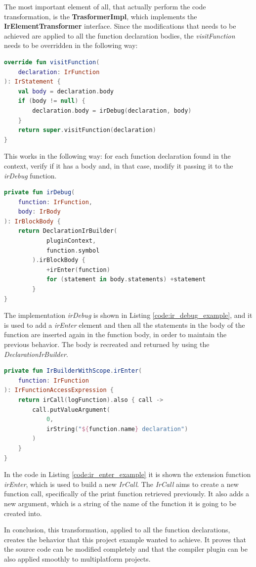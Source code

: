 The most important element of all, that actually perform the code transformation, is the \textbf{TrasformerImpl}, which implements the \textbf{IrElementTransformer} interface.\newline
Since the modifications that needs to be achieved are applied to all the function declaration bodies, the \textit{visitFunction}  needs to be overridden in the following way:
\begin{lstlisting}[caption={Example of \textit{visitFunction} implementation of the transformer, used to visit all the function declarations}, captionpos=b, language=Kotlin, label={code:visit_function_declaration_example}]
override fun visitFunction(
    declaration: IrFunction
): IrStatement {
    val body = declaration.body
    if (body != null) {
        declaration.body = irDebug(declaration, body)
    }
    return super.visitFunction(declaration)
}
\end{lstlisting}
This works in the following way: for each function declaration found in the context, verify if it has a body and, in that case, modify it passing it to the \textit{irDebug} function.
\begin{lstlisting}[caption={Example of implementation of a function that adds a new element into the function body}, captionpos=b, language=Kotlin, label={code:ir_debug_example}]
private fun irDebug(
    function: IrFunction,
    body: IrBody
): IrBlockBody {
    return DeclarationIrBuilder(
            pluginContext,
            function.symbol
        ).irBlockBody {
            +irEnter(function)
            for (statement in body.statements) +statement
        }
}
\end{lstlisting}
The implementation \textit{irDebug} is shown in Listing \ref{code:ir_debug_example}, and it is used to add a \textit{irEnter} element and then all the statements in the body of the function are inserted again in the function body, in order to maintain the previous behavior. The body is recreated and returned by using the \textit{DeclarationIrBuilder}.

\begin{lstlisting}[caption={Example of creation of a new function call and adding to it arguments}, captionpos=b, language=Kotlin, label={code:ir_enter_example}]
private fun IrBuilderWithScope.irEnter(
    function: IrFunction
): IrFunctionAccessExpression {
    return irCall(logFunction).also { call ->
        call.putValueArgument(
            0,
            irString("${function.name} declaration")
        )
    }
}
\end{lstlisting}
In the code in Listing \ref{code:ir_enter_example} it is shown the extension function \textit{irEnter}, which is used to build a new \textit{IrCall}. The \textit{IrCall} aims to create a new function call, specifically of the print function retrieved previously. It also adds a new argument, which is a string of the name of the function it is going to be created into.

In conclusion, this transformation, applied to all the function declarations, creates the behavior that this project example wanted to achieve.\newline
It proves that the source code can be modified completely and that the compiler plugin can be also applied smoothly to multiplatform projects.